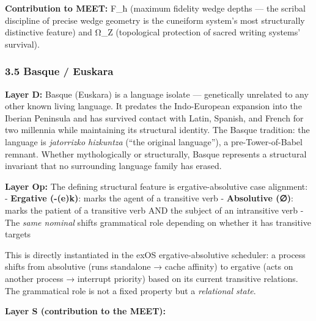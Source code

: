 \documentclass[
  11pt,
  a4paper,
]{article}
\begin{document}
\textbf{Contribution to MEET:} F\_ħ (maximum fidelity wedge depths ---
the scribal discipline of precise wedge geometry is the cuneiform
system's most structurally distinctive feature) and Ω\_Z (topological
protection of sacred writing systems' survival).

\subsubsection{3.5 Basque / Euskara}\label{basque-euskara}

\textbf{Layer D:} Basque (Euskara) is a language isolate --- genetically
unrelated to any other known living language. It predates the
Indo-European expansion into the Iberian Peninsula and has survived
contact with Latin, Spanish, and French for two millennia while
maintaining its structural identity. The Basque tradition: the language
is \emph{jatorrizko hizkuntza} (``the original language''), a
pre-Tower-of-Babel remnant. Whether mythologically or structurally,
Basque represents a structural invariant that no surrounding language
family has erased.

\textbf{Layer Op:} The defining structural feature is
ergative-absolutive case alignment: - \textbf{Ergative (-(e)k)}: marks
the agent of a transitive verb - \textbf{Absolutive (∅)}: marks the
patient of a transitive verb AND the subject of an intransitive verb -
The \emph{same nominal} shifts grammatical role depending on whether it
has transitive targets

This is directly instantiated in the exOS ergative-absolutive scheduler:
a process shifts from absolutive (runs standalone → cache affinity) to
ergative (acts on another process → interrupt priority) based on its
current transitive relations. The grammatical role is not a fixed
property but a \emph{relational state}.

\textbf{Layer S (contribution to the MEET):}
\end{document}
